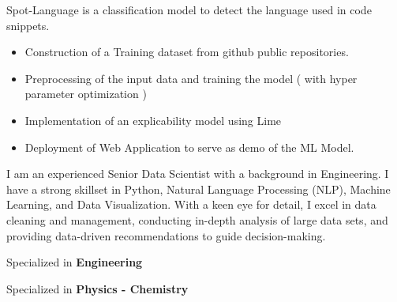\documentclass[10pt,letter,ragged2e,withhyper]{altacv}
\renewcommand{\divider}{\vspace{-0.2cm}\textcolor{body!30}{\hdashrule{\linewidth}{0.6pt}{0.5ex}}\smallskip\vspace{-0.1cm}} %
\begin{document}
\begin{paracol}{2}


Spot-Language is a classification model to detect the language used in code snippets.

\begin{itemize}
      \item Construction of a Training dataset from github public repositories.
      \item Preprocessing of the input data and training the model ( with hyper parameter optimization )
      \item Implementation of an explicability model using Lime
      \item Deployment of Web Application to serve as demo of the ML Model.
  \end{itemize}

\divider
{}





\switchcolumn
{}
{\small
I am an experienced Senior Data Scientist with a background in Engineering.
I have a strong skillset in Python, Natural Language Processing (NLP), Machine
Learning, and Data Visualization. With a keen eye for detail, I excel in data
cleaning and management, conducting in-depth analysis of large data sets, and
providing data-driven recommendations to guide decision-making. 

}


{\small Specialized in \textbf{Engineering}}

\divider
{}
{\small Specialized in \textbf{Physics - Chemistry}}




\end{paracol}
\end{document}
